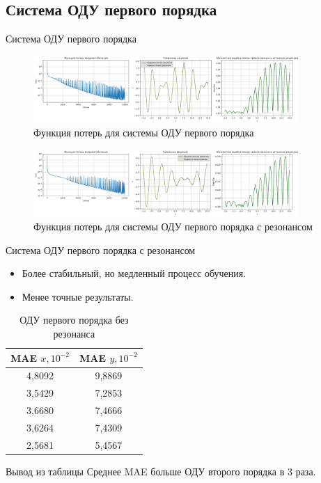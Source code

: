 \documentclass{beamer}
\begin{document}
\subsection{Система ОДУ первого порядка}
\begin{frame}{Система ОДУ первого порядка}
    \begin{figure}[h!]
        \centering
        \includegraphics[width=0.9\textwidth]{images/Loss&x_ODE_of_the_first_order.png}
        \caption{Функция потерь для системы ОДУ первого порядка}
        \label{fig:loss_first_order}
    \end{figure}
    \begin{figure}[h!]
        \centering
        \includegraphics[width=0.9\textwidth]{images/Loss&x_ODE_of_the_first_order_resonance.png}
        \caption{Функция потерь для системы ОДУ первого порядка с резонансом}
        \label{fig:loss_first_order_resonance}
    \end{figure}
\end{frame}

\begin{frame}{Система ОДУ первого порядка с резонансом}
    \begin{itemize}
        \item Более стабильный, но медленный процесс обучения.
        \item Менее точные результаты.
    \end{itemize}
    \begin{table}[h!]
        \centering
        \begin{tabular}{|c|c|}
        \hline
        \textbf{MAE $x, 10^{-2}$} & \textbf{MAE $y, 10^{-2}$} \\
        \hline
        4,8092 & 9,8869 \\
        3,5429 & 7,2853 \\
        3,6680 & 7,4666 \\
        3,6264 & 7,4309 \\
        2,5681 & 5,4567 \\
        \hline
        \end{tabular}
        \caption{ОДУ первого порядка без резонанса}
    \end{table}
    \begin{block}{Вывод из таблицы}
        Среднее MAE больше ОДУ второго порядка в 3 раза.
    \end{block}
\end{frame}
\end{document}
